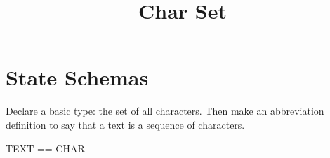 \documentclass{article}
\title{Char Set}
\begin{document}
\maketitle

\section{State Schemas}
Declare a basic type: the set of all characters.
Then make an abbreviation definition to say that a text is a sequence of characters.

\begin{zed}
[CHAR]
\end{zed}

\begin{zed}
    TEXT == \seq CHAR
\end{zed}
\end{document}
